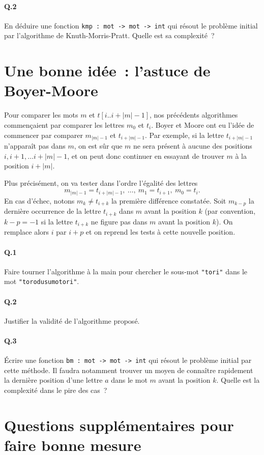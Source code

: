 \documentclass[10pt,a4paper]{article}
\begin{document}
\paragraph{Q.2} En déduire une fonction \texttt{kmp : mot -> mot -> int} qui 
résout le problème initial par l'algorithme de Knuth-Morris-Pratt. Quelle est 
sa complexité~?

\section{Une bonne idée~: l'astuce de Boyer-Moore} 
Pour comparer les mots $m$ et $t[i..i+|m|-1]$, nos précédents 
algorithmes commençaient par comparer les lettres $m_0$ et $t_i$. Boyer et 
Moore ont eu l'idée de commencer par comparer $m_{|m|-1}$ et $t_{i+|m|-1}$. Par 
exemple, si la lettre $t_{i+|m|-1}$ n'apparaît pas dans $m$, on est sûr que $m$ 
ne sera présent à aucune des positions $i, i+1, \dots i+|m|-1$, et on peut donc 
continuer en essayant de trouver $m$ à la position $i+|m|$.

Plus précisément, on va tester dans l'ordre l'égalité des lettres
\[m_{|m|-1} = t_{i+|m|-1}, \ \dots, \ m_1 = t_{i+1}, \ m_0 = t_i.\]
En cas d'échec, notons $m_k \neq t_{i+k}$ la première différence constatée. Soit 
$m_{k-p}$ la dernière occurrence de la lettre $t_{i+k}$ dans $m$ avant la 
position $k$ (par convention, $k-p=-1$ si la lettre $t_{i+k}$ ne figure pas dans
$m$ avant la position $k$). On remplace alors $i$ par $i+p$ et on reprend les 
tests à cette nouvelle position.
\paragraph{Q.1} Faire tourner l'algorithme à la main pour chercher le sous-mot 
\texttt{"tori"} dans le mot \texttt{"torodusumotori"}.
\paragraph{Q.2} Justifier la validité de l'algorithme proposé.
\paragraph{Q.3} Écrire une fonction \texttt{bm : mot -> mot -> int} qui résout
le problème initial par cette méthode. Il faudra notamment trouver un moyen de 
connaître rapidement la dernière position d'une lettre $a$ dans le mot $m$ avant
la position $k$. Quelle est la complexité dans le pire des cas~?
\section{Questions supplémentaires pour faire bonne mesure}
\end{document}
